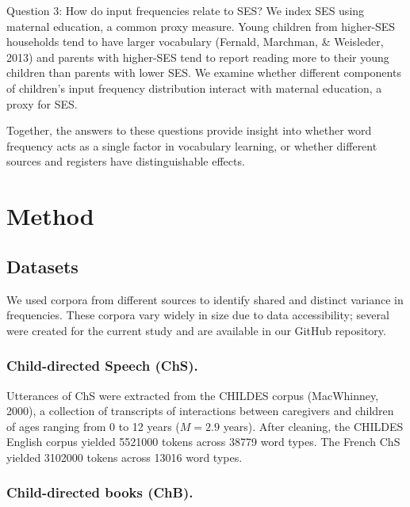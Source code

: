 \documentclass[10pt, letterpaper]{article}
\begin{document}
Question 3: How do input frequencies relate to SES? We index SES using
maternal education, a common proxy measure. Young children from
higher-SES households tend to have larger vocabulary (Fernald, Marchman,
\& Weisleder, 2013) and parents with higher-SES tend to report reading
more to their young children than parents with lower SES. We examine
whether different components of children's input frequency distribution
interact with maternal education, a proxy for SES.

Together, the answers to these questions provide insight into whether
word frequency acts as a single factor in vocabulary learning, or
whether different sources and registers have distinguishable effects.

\hypertarget{method}{%
\section{Method}\label{method}}

\hypertarget{datasets}{%
\subsection{Datasets}\label{datasets}}

We used corpora from different sources to identify shared and distinct
variance in frequencies. These corpora vary widely in size due to data
accessibility; several were created for the current study and are
available in our GitHub repository.

\hypertarget{child-directed-speech-chs.}{%
\subsubsection{Child-directed Speech
(ChS).}\label{child-directed-speech-chs.}}

Utterances of ChS were extracted from the CHILDES corpus (MacWhinney,
2000), a collection of transcripts of interactions between caregivers
and children of ages ranging from 0 to 12 years (\(M=2.9\) years). After
cleaning, the CHILDES English corpus yielded 5521000 tokens across 38779
word types. The French ChS yielded 3102000 tokens across 13016 word
types.

\hypertarget{child-directed-books-chb.}{%
\subsubsection{Child-directed books
(ChB).}\label{child-directed-books-chb.}}
\end{document}

